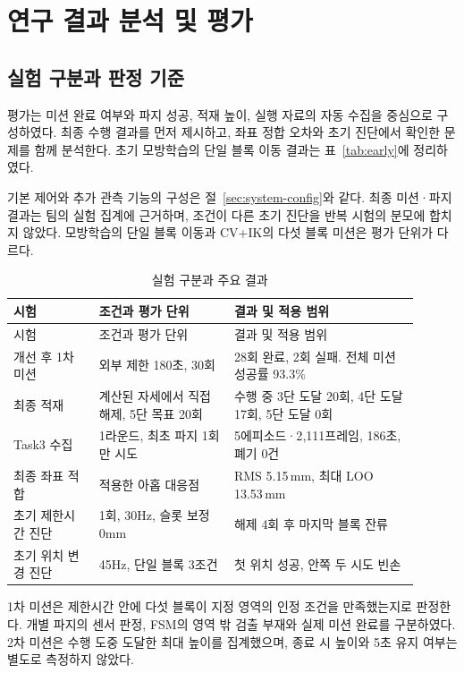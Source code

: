 \chapter{연구 결과 분석 및 평가}
\section{실험 구분과 판정 기준}
평가는 미션 완료 여부와 파지 성공, 적재 높이, 실행 자료의 자동 수집을 중심으로 구성하였다. 최종 수행 결과를 먼저 제시하고, 좌표 정합 오차와 초기 진단에서 확인한 문제를 함께 분석한다. 초기 모방학습의 단일 블록 이동 결과는 표~\ref{tab:early}에 정리하였다.

기본 제어와 추가 관측 기능의 구성은 절~\ref{sec:system-config}와 같다. 최종 미션·파지 결과는 팀의 실험 집계에 근거하며, 조건이 다른 초기 진단을 반복 시험의 분모에 합치지 않았다. 모방학습의 단일 블록 이동과 CV+IK의 다섯 블록 미션은 평가 단위가 다르다.

\begin{longtable}{@{}L{0.19\linewidth}L{0.30\linewidth}L{0.41\linewidth}@{}}
\caption{실험 구분과 주요 결과}\label{tab:eval-definitions}\\
\toprule 시험 & 조건과 평가 단위 & 결과 및 적용 범위 \\\midrule
\endfirsthead
\toprule 시험 & 조건과 평가 단위 & 결과 및 적용 범위 \\\midrule
\endhead
개선 후 1차 미션 & 외부 제한 180초, 30회 & 28회 완료, 2회 실패. 전체 미션 성공률 93.3\% \\
최종 적재 & 계산된 자세에서 직접 해제, 5단 목표 20회 & 수행 중 3단 도달 20회, 4단 도달 17회, 5단 도달 0회 \\
Task3 수집 & 1라운드, 최초 파지 1회만 시도 & 5에피소드·2{,}111프레임, 186초, 폐기 0건 \\
최종 좌표 적합 & 적용한 아홉 대응점 & RMS 5.15\,mm, 최대 LOO 13.53\,mm \\
초기 제한시간 진단 & 1회, 30Hz, 슬롯 보정 0mm & 해제 4회 후 마지막 블록 잔류 \\
초기 위치 변경 진단 & 45Hz, 단일 블록 3조건 & 첫 위치 성공, 안쪽 두 시도 빈손 \\
\bottomrule
\end{longtable}

1차 미션은 제한시간 안에 다섯 블록이 지정 영역의 인정 조건을 만족했는지로 판정한다. 개별 파지의 센서 판정, FSM의 영역 밖 검출 부재와 실제 미션 완료를 구분하였다. 2차 미션은 수행 도중 도달한 최대 높이를 집계했으며, 종료 시 높이와 5초 유지 여부는 별도로 측정하지 않았다.

